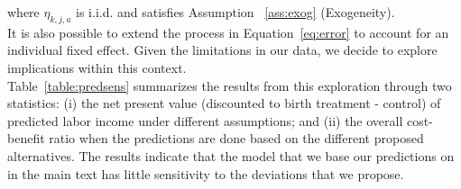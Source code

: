 \noindent where $\eta_{k,j,{a}}$ is i.i.d. and satisfies Assumption ~\ref{ass:exog} (Exogeneity).\\

\noindent It is also possible to extend the process in Equation~\eqref{eq:error} to account for an individual fixed effect. Given the limitations in our data, we decide to explore implications within this context.\\

\noindent Table~\ref{table:predsens} summarizes the results from this exploration through two statistics: (i) the net present value (discounted to birth treatment - control) of predicted labor income under different assumptions; and (ii) the overall cost-benefit ratio when the predictions are done based on the different proposed alternatives. The results indicate that the model that we base our predictions on in the main text has little sensitivity to the deviations that we propose.

